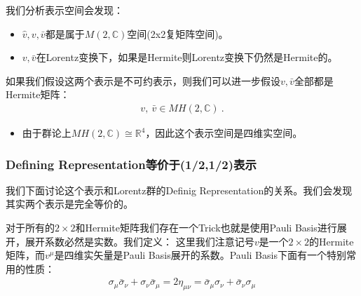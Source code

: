 \bigskip
{}

我们分析表示空间会发现：
\begin{itemize}
  \item $ \hat{v},v,\bar{v} $都是属于$ M(2,\mathbb{C}) $空间(2x2复矩阵空间)。
  \item $ v, \bar{v} $在Lorentz变换下，如果是Hermite则Lorentz变换下仍然是Hermite的。
\end{itemize}
如果我们假设这两个表示是不可约表示，则我们可以进一步假设$ v, \bar{v} $全部都是Hermite矩阵：
\begin{align}
  v,\mathrm{~}\bar{v}\in MH(2,\mathbb{C})\mathrm{~.}
\end{align}
\begin{itemize}
  \item 由于群论上$ MH(2,\mathbb{C}) \cong \mathbb{R}^4 $，因此这个表示空间是四维实空间。
\end{itemize}

\subsubsection{Defining Representation等价于(1/2,1/2)表示}
我们下面讨论这个表示和Lorentz群的Definig Representation的关系。我们会发现其实两个表示是完全等价的。

\bigskip
{}

对于所有的$ 2 \times 2 $和Hermite矩阵我们存在一个Trick也就是使用Pauli Basis进行展开，展开系数必然是实数。我们定义：
这里我们注意记号$ v $是一个$ 2 \times 2 $的Hermite矩阵，而$ v^\mu $是四维实矢量是Pauli
Basis展开的系数。Pauli Basis下面有一个特别常用的性质：
\begin{align}
  \sigma_\mu\bar{\sigma}_\nu+\sigma_\nu\bar{\sigma}_\mu=2\eta_{\mu\nu}=\bar{\sigma}_\mu\sigma_\nu+\bar{\sigma}_\nu\sigma_\mu
\end{align}

